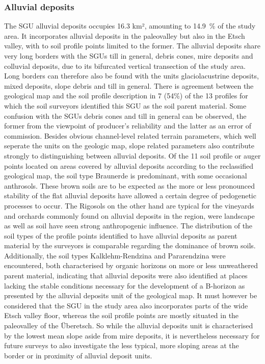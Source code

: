 \documentclass[preprint,12pt,authoryear]{elsarticle}
\begin{document}
\subsubsection{Alluvial deposits}
The SGU alluvial deposits occupies 16.3 km², amounting to 14.9~\% of the study area. It incorporates alluvial deposits in the paleovalley but also in the Etsch valley, with to soil profile points limited to the former. The alluvial deposits share very long borders with the SGUs till in general, debris cones, mire deposits and colluvial deposits, due to its bifurcated vertical transection of the study area. Long borders can therefore also be found with the units glaciolacustrine deposits, mixed deposits, slope debris and till in general. There is agreement between the geological map and the soil profile description in 7 (54\%) of the 13 profiles for which the soil surveyors identified this SGU as the soil parent material. Some confusion with the SGUs debris cones and till in general can be observed, the former from the viewpoint of producer's reliability and the latter as an error of commission. 
Besides obvious channel-level related terrain parameters, which well seperate the units on the geologic map, slope related parameters also contribute strongly to distinguishing between alluvial deposits. 
Of the 11 soil profile or auger points located on areas covered by alluvial deposits according to the reclassified geological map, the soil type Braunerde is predominant, with some occasional anthrosols. These brown soils are to be expected as the more or less pronounced stability of the flat alluvial deposits have allowed a certain degree of pedogenetic processes to occur. The Rigosols on the other hand are typical for the vineyards and orchards commonly found on alluvial deposits in the region, were landscape as well as soil have seen strong anthropogenic influence. The distribution of the soil types of the profile points identified to have alluvial deposits as parent material by the surveyors is comparable regarding the dominance of brown soils. Additionally, the soil types Kalklehm-Rendzina and Pararendzina were encountered, both characterised by organic horizons on more or less unweathered parent material, indicating that alluvial deposits were also identified at places lacking the stable conditions necessary for the development of a B-horizon as presented by the alluvial deposits unit of the geological map. It must however be considered that the SGU in the study area also incorporates parts of the wide Etsch valley floor, whereas the soil profile points are mostly situated in the paleovalley of the {\"U}beretsch. So while the alluvial deposits unit is characterised by the lowest mean slope aside from mire deposits, it is nevertheless necessary for future surveys to also investigate the less typical, more sloping areas at the border or in proximity of alluvial deposit units.
\end{document}
